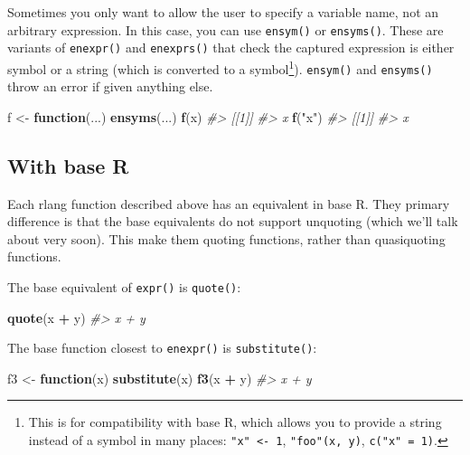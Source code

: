 \documentclass[]{book}
\makeatletter
\newenvironment{Shaded}{\begin{snugshade}}{\end{snugshade}}
\newcommand{\CommentTok}[1]{\textcolor[rgb]{0.37,0.37,0.37}{\textit{#1}}}
\newcommand{\ControlFlowTok}[1]{\textcolor[rgb]{0.27,0.27,0.27}{\textbf{#1}}}
\newcommand{\KeywordTok}[1]{\textcolor[rgb]{0.27,0.27,0.27}{\textbf{#1}}}
\newcommand{\NormalTok}[1]{#1}
\newcommand{\OperatorTok}[1]{\textcolor[rgb]{0.43,0.43,0.43}{\textbf{#1}}}
\newcommand{\StringTok}[1]{\textcolor[rgb]{0.5,0.5,0.5}{#1}}
\let\rmarkdownfootnote\footnote%
\def\footnote{\protect\rmarkdownfootnote}
\newcommand{\indexc}[1]{\index{#1@\texttt{#1}}}
\makeatother
\begin{document}
\indexc{ensym()}

Sometimes you only want to allow the user to specify a variable name, not an arbitrary expression. In this case, you can use \texttt{ensym()} or \texttt{ensyms()}. These are variants of \texttt{enexpr()} and \texttt{enexprs()} that check the captured expression is either symbol or a string (which is converted to a symbol\footnote{This is for compatibility with base R, which allows you to provide a string instead of a symbol in many places: \texttt{"x"\ \textless{}-\ 1}, \texttt{"foo"(x,\ y)}, \texttt{c("x"\ =\ 1)}.}). \texttt{ensym()} and \texttt{ensyms()} throw an error if given anything else.

\begin{Shaded}
\begin{Highlighting}[]
\NormalTok{f <-}\StringTok{ }\ControlFlowTok{function}\NormalTok{(...) }\KeywordTok{ensyms}\NormalTok{(...)}
\KeywordTok{f}\NormalTok{(x)}
\CommentTok{#> [[1]]}
\CommentTok{#> x}
\KeywordTok{f}\NormalTok{(}\StringTok{"x"}\NormalTok{)}
\CommentTok{#> [[1]]}
\CommentTok{#> x}
\end{Highlighting}
\end{Shaded}

\hypertarget{with-base-r}{%
\subsection{With base R}\label{with-base-r}}


Each rlang function described above has an equivalent in base R. They primary difference is that the base equivalents do not support unquoting (which we'll talk about very soon). This make them quoting functions, rather than quasiquoting functions.

The base equivalent of \texttt{expr()} is \texttt{quote()}:

\begin{Shaded}
\begin{Highlighting}[]
\KeywordTok{quote}\NormalTok{(x }\OperatorTok{+}\StringTok{ }\NormalTok{y)}
\CommentTok{#> x + y}
\end{Highlighting}
\end{Shaded}

The base function closest to \texttt{enexpr()} is \texttt{substitute()}:

\begin{Shaded}
\begin{Highlighting}[]
\NormalTok{f3 <-}\StringTok{ }\ControlFlowTok{function}\NormalTok{(x) }\KeywordTok{substitute}\NormalTok{(x)}
\KeywordTok{f3}\NormalTok{(x }\OperatorTok{+}\StringTok{ }\NormalTok{y)}
\CommentTok{#> x + y}
\end{Highlighting}
\end{Shaded}
\end{document}
